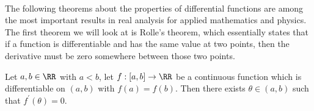 \documentclass[../real_analysis.tex]{subfiles}
\begin{document}
        \paragraph{}
        The following theorems about the properties of differential functions are among the most important results in real analysis for applied mathematics and physics. The first theorem we will look at is Rolle's theorem, which essentially states that if a function is differentiable and has the same value at two points, then the derivative must be zero somewhere between those two points.
        \begin{theorem}\label{rolles-thm}
            Let $a,b\in\RR$ with $a<b$, let $f:[a,b]\to\RR$ be a continuous function which is differentiable on $(a,b)$ with $f(a)=f(b)$. Then there exists $\theta\in(a,b)$ such that $f^\prime(\theta)=0$.
        \end{theorem}
\end{document}
